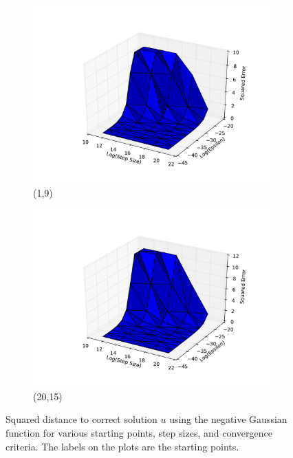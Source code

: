 \documentclass[psamsfonts]{amsart}
\theoremstyle{definition}
\theoremstyle{remark}
\numberwithin{equation}{section}
\begin{document}
\begin{figure}
\begin{subfigure}[b]{0.45\textwidth}
	\includegraphics[width=\textwidth]{hw1_1-1_2.pdf}
	\caption{(1,9)}
	\end{subfigure}
	\begin{subfigure}[b]{0.45\textwidth}
		\includegraphics[width=\textwidth]{hw1_1-1_3.pdf}
		\caption{(20,15)}
		\end{subfigure}
\caption{Squared distance to correct solution $u$ using the negative Gaussian function for various starting points, step sizes, and convergence criteria. The labels on the plots are the starting points.}
\end{figure}
\end{document}
